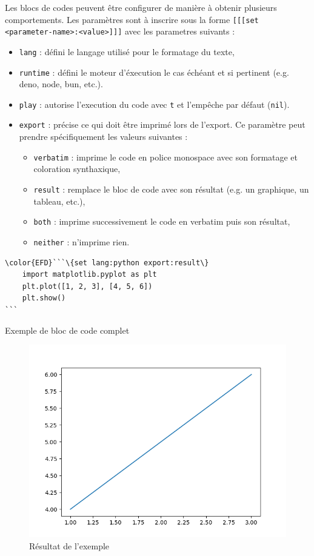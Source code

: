 \documentclass[a4paper,12pt]{article}
\begin{document}
Les blocs de codes peuvent être configurer de manière à obtenir plusieurs comportements. Les paramètres sont à inscrire sous la forme \texttt{[[[set <parameter-name>:<value>]]]} avec les parametres suivants :
\begin{itemize}
\item \texttt{lang} : défini le langage utilisé pour le formatage du texte,
\item \texttt{runtime} : défini le moteur d'éxecution le cas échéant et si pertinent (e.g. deno, node, bun, etc.).
\item \texttt{play} : autorise l'execution du code avec \texttt{t} et l'empêche par défaut (\texttt{nil}).
\item \texttt{export} : précise ce qui doit être imprimé lors de l'export. Ce paramètre peut prendre spécifiquement les valeurs suivantes :
\begin{itemize}
\item \texttt{verbatim} : imprime le code en police monospace avec son formatage et coloration synthaxique,
\item \texttt{result} : remplace le bloc de code avec son résultat (e.g. un graphique, un tableau, etc.),
\item \texttt{both} : imprime successivement le code en verbatim puis son résultat,
\item \texttt{neither} : n'imprime rien.
\end{itemize}
\end{itemize}

\begin{listing}[htbp]
\begin{Code}
\begin{Verbatim}
\color{EFD}```\{set lang:python export:result\}
    import matplotlib.pyplot as plt
    plt.plot([1, 2, 3], [4, 5, 6])
    plt.show()
```
\end{Verbatim}
\end{Code}
\caption{Exemple de bloc de code complet}
\end{listing}

\begin{figure}[htbp]
\centering
\includegraphics[width=.9\linewidth]{./quickDoc-exemple-code.png}
\caption{Résultat de l'exemple}
\end{figure}
\end{document}
